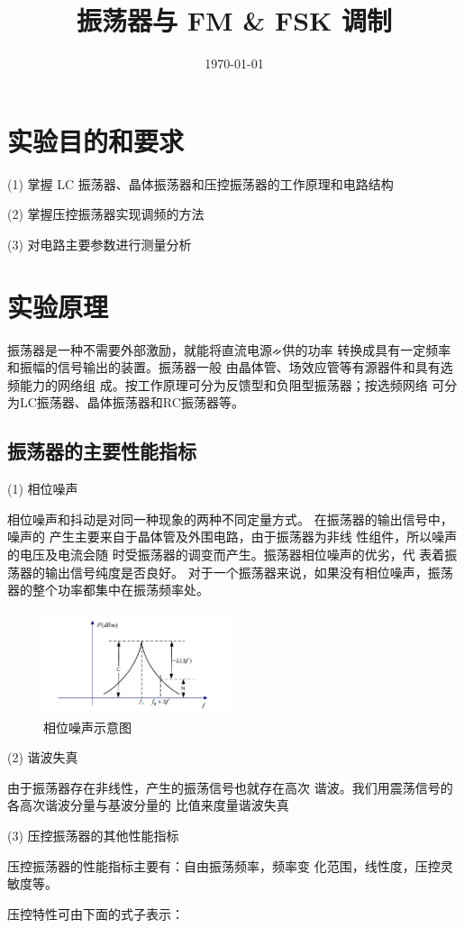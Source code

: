 \documentclass{../source/Experiment}
\title{振荡器与 FM \& FSK 调制}
\date{\today}
\begin{document}
\makecover
\makeheader
\section{实验目的和要求}
 (1) 掌握 LC 振荡器、晶体振荡器和压控振荡器的工作原理和电路结构

(2) 掌握压控振荡器实现调频的方法

(3) 对电路主要参数进行测量分析


\section{实验原理}
振荡器是一种不需要外部激励，就能将直流电源ᨀ供的功率
转换成具有一定频率和振幅的信号输出的装置。振荡器一般
由晶体管、场效应管等有源器件和具有选频能力的网络组
成。按工作原理可分为反馈型和负阻型振荡器；按选频网络
可分为LC振荡器、晶体振荡器和RC振荡器等。

\subsection{振荡器的主要性能指标}

(1) 相位噪声

相位噪声和抖动是对同一种现象的两种不同定量方式。
在振荡器的输出信号中，噪声的
产生主要来自于晶体管及外围电路，由于振荡器为非线
性组件，所以噪声的电压及电流会随
时受振荡器的调变而产生。振荡器相位噪声的优劣，代
表着振荡器的输出信号纯度是否良好。
对于一个振荡器来说，如果没有相位噪声，振荡器的整个功率都集中在振荡频率处。
\begin{figure}[H]
    \centering
    \includegraphics[width = 0.5\textwidth]{lab3/1.png}
    \caption{相位噪声示意图}
\end{figure}

(2) 谐波失真

由于振荡器存在非线性，产生的振荡信号也就存在高次
谐波。我们用震荡信号的各高次谐波分量与基波分量的
比值来度量谐波失真

(3) 压控振荡器的其他性能指标

压控振荡器的性能指标主要有：自由振荡频率，频率变
化范围，线性度，压控灵敏度等。

压控特性可由下面的式子表示：
\end{document}
